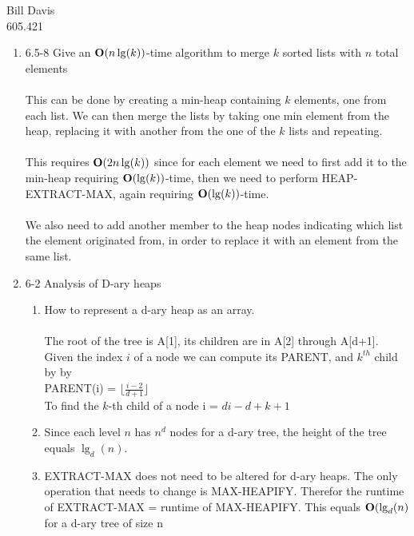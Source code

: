 \documentclass[11pt,fleqn]{article}
\begin{document}
\newcommand{\mbf}[1]{\mbox{{\bfseries #1}}}
\newcommand{\N}{\mbf{N}}
\renewcommand{\O}{\mbf{O}}

\noindent Bill Davis \\
605.421 

\begin{enumerate}
\item 
6.5-8 Give an $\O(n\lg(k))$-time algorithm to merge $k$ sorted lists with $n$ total elements \\
\\
This can be done by creating a min-heap containing $k$ elements, one from 
each list. We can then merge the lists by taking one min element from the 
heap, replacing it with another from the one of the $k$ lists and repeating. \\
\\
This requires $\O(2n\lg(k))$ since for each element we need to first add it
to the min-heap requiring $\O(\lg(k))$-time, then we need to perform 
HEAP-EXTRACT-MAX, again requiring $\O(\lg(k))$-time. \\
\\
We also need to add another member to the heap nodes indicating which 
list the element originated from, in order to replace it with an element 
from the same list. \\

\item
6-2 Analysis of D-ary heaps \\
\begin{enumerate}
\item 
How to represent a d-ary heap as an array. \\
\\
The root of the tree is A[1], its children are in A[2] through A[d+1]. Given the index $i$ of a node we can compute its PARENT, and $k^{th}$ child by by \\
PARENT(i) = $\lfloor \frac{i-2}{d+1}\rfloor$ \\
To find the $k$-th child of a node i = $ di-d + k + 1 $     \\

\item
Since each level $n$ has $n^{d}$ nodes for a d-ary tree, the height of the tree equals $\lg_{d}(n)$.

\item
EXTRACT-MAX does not need to be altered for d-ary heaps. The only operation that needs to change is MAX-HEAPIFY. Therefor the runtime of EXTRACT-MAX = runtime of MAX-HEAPIFY. This equals $\O(\lg_{d}(n)$ for a d-ary tree of size n


\end{enumerate}
\end{enumerate}
\end{document}

